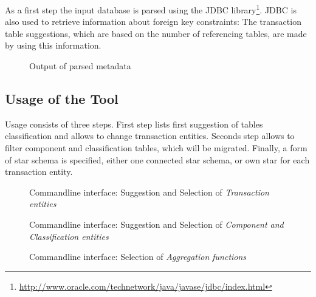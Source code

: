 As a first step the input database is parsed using the JDBC library\footnote{\url{http://www.oracle.com/technetwork/java/javase/jdbc/index.html}}.
JDBC is also used to retrieve information about foreign key constraints: The transaction table suggestions, which are based on the number of referencing tables, are made by using this information.

\begin{figure}[p]
  
  \caption{Output of parsed metadata}
  \label{fig:metadataOutput}
\end{figure}

\subsection{Usage of the Tool}

Usage consists of three steps.
First step lists first suggestion of tables classification and allows to change transaction entities.
Seconds step allows to filter component and classification tables, which will be migrated.
Finally, a form of star schema is specified, either one connected star schema, or own star for each transaction entity.

\begin{figure}[p]
  
  \caption{Commandline interface: Suggestion and Selection of \emph{Transaction entities}}
  \label{fig:transactionSuggestion}
\end{figure}

\begin{figure}[p]
  
  \caption{Commandline interface: Suggestion and Selection of \emph{Component and Classification entities}}
  \label{fig:dimensionalModelSuggestion}
\end{figure}

\begin{figure}[p]
  
  \caption{Commandline interface: Selection of \emph{Aggregation functions}}
  \label{fig:aggregationSelection}
\end{figure}


